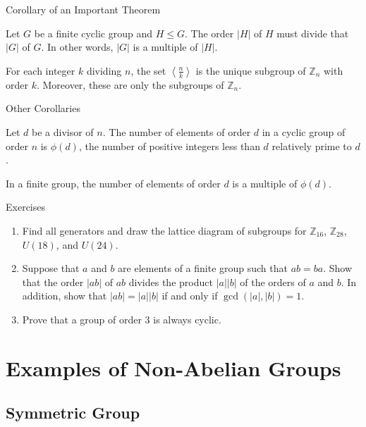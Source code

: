 \documentclass{beamer}
\begin{document}
\begin{frame}{Corollary of an Important Theorem}
\begin{corollary}
\justifying
Let $G$ be a finite cyclic group and $H \leq G$. The order $|H|$ of $H$ must divide that $|G|$ of $G$. In other words, $|G|$ is a multiple of $|H|$.
\end{corollary}     
\begin{corollary}
\justifying
For each integer $k$ dividing $n$, the set $\left\langle \frac{n}{k}\right\rangle$ is the unique subgroup of $\mathbb{Z}_n$ with order $k$. Moreover, these are only the subgroups of $\mathbb{Z}_n$. 
\end{corollary}   
\end{frame}

\begin{frame}{Other Corollaries}
\begin{corollary}
\justifying
Let $d$ be a divisor of $n$. The number of elements of order $d$ in a cyclic group of order $n$ is $\phi(d)$, the number of positive integers less than $d$ relatively prime to $d$.
\end{corollary}   
\begin{corollary}
\justifying
In a finite group, the number of elements of order $d$ is a multiple of $\phi(d)$.
\end{corollary}   
\end{frame}

\begin{frame}{Exercises}
\begin{enumerate}
\justifying
\item Find all generators and draw the lattice diagram of subgroups for $\mathbb{Z}_{16}$, $\mathbb{Z}_{28}$, $U(18)$, and $U(24)$.
\item Suppose that $a$ and $b$ are elements of a finite group such that $ab = ba$. Show that the order $|ab|$ of $ab$ divides the product $|a||b|$ of the orders of $a$ and $b$. In addition, show that $|ab| = |a||b|$ if and only if $\gcd(|a|, |b|) = 1$.
\item Prove that a group of order $3$ is always cyclic.
\end{enumerate}    
\end{frame}

\section{Examples of Non-Abelian Groups}

\subsection{Symmetric Group}
\end{document}
